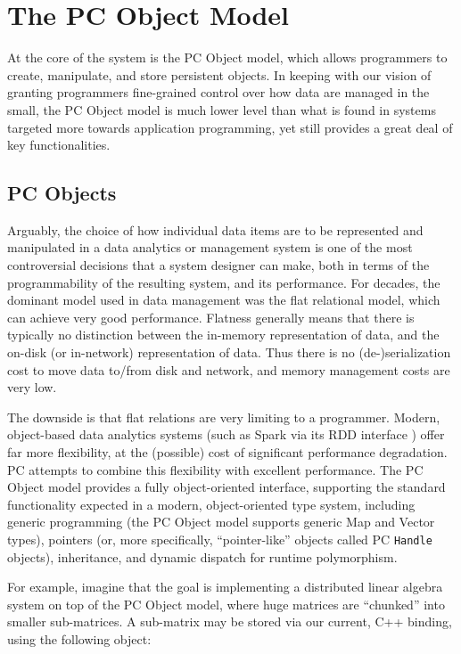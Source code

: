 \section{The PC Object Model} \label{sec:ObjectModel}

At the core of the system is the PC Object model, which allows 
programmers to create, manipulate, and store persistent objects.
In keeping with our vision of granting programmers fine-grained control over how data are managed in the small, the PC Object model
is much lower level than what is found in systems targeted more towards application programming, yet still provides a great deal of
key functionalities.

\subsection{PC Objects}

Arguably, the choice of how individual data items are to be represented and manipulated
in a data analytics or management system is one of the most
controversial decisions
that a system designer can make, both in terms of 
the programmability of the resulting system, and its performance.  For decades, the dominant model used in
data management was the flat relational model, which 
can achieve very good performance.
Flatness generally means 
that there is typically no distinction between the in-memory representation of data, and the on-disk (or in-network) representation of
data. Thus there is no (de-)serialization cost to move data to/from
disk and network, and memory management costs are very low. 

The downside is that flat relations are very limiting to a programmer.  Modern, object-based 
data analytics systems 
(such as Spark via its RDD interface \cite{zaharia2012resilient}) offer far more flexibility, at the (possible) cost of significant performance degradation.  
PC attempts to combine this flexibility with excellent performance.
The PC Object model provides a fully object-oriented interface, supporting the standard functionality expected in a modern, object-oriented type system,
including generic programming (the PC Object model supports generic Map and Vector types), pointers (or, more specifically,
``pointer-like'' objects called PC \texttt{Handle} objects), inheritance, and dynamic dispatch for runtime polymorphism.  

For example, imagine that the goal is implementing a distributed linear algebra system on top of the PC Object model, where huge matrices are ``chunked'' into
smaller sub-matrices.  A sub-matrix may be stored via our current, C++ binding, using the following object:

